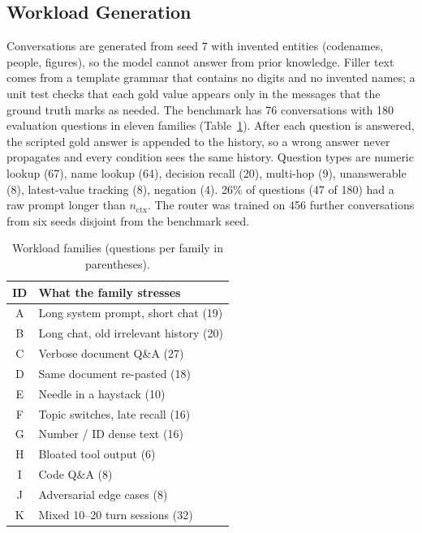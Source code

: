 \documentclass[journal]{IEEEtran}
\begin{document}
\subsection{Workload Generation}
Conversations are generated from seed 7 with invented entities (codenames, people, figures), so the model cannot answer from
prior knowledge. Filler text comes from a template grammar that contains no digits and no invented names; a unit test checks that
each gold value appears only in the messages that the ground truth marks as needed. The benchmark has 76 conversations with
180 evaluation questions in eleven families (Table~\ref{tab:fam}). After each question is answered, the scripted gold answer is
appended to the history, so a wrong answer never propagates and every condition sees the same history. Question types are
numeric lookup (67), name lookup (64), decision recall (20), multi-hop (9), unanswerable (8), latest-value tracking (8), negation (4). 26\% of questions (47 of 180) had a raw prompt longer than $n_\text{ctx}$. The router was
trained on 456 further conversations from six seeds disjoint from the benchmark seed.
\begin{table}[t]\centering\caption{Workload families (questions per family in parentheses).}\label{tab:fam}\footnotesize
\begin{tabular}{cl}\toprule ID & What the family stresses\\\midrule
A & Long system prompt, short chat (19)\\
B & Long chat, old irrelevant history (20)\\
C & Verbose document Q\&A (27)\\
D & Same document re-pasted (18)\\
E & Needle in a haystack (10)\\
F & Topic switches, late recall (16)\\
G & Number / ID dense text (16)\\
H & Bloated tool output (6)\\
I & Code Q\&A (8)\\
J & Adversarial edge cases (8)\\
K & Mixed 10–20 turn sessions (32)\\
\bottomrule\end{tabular}\end{table}
\end{document}

